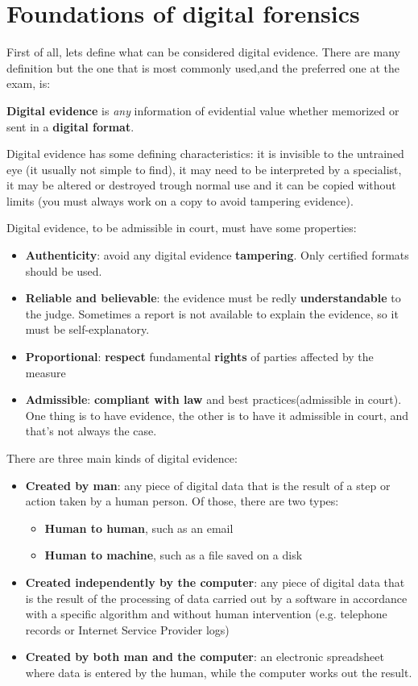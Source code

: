 \chapter{Foundations of digital forensics}
First of all, lets define what can be considered digital evidence.
There are many definition but the one that is most commonly used,and
the preferred one at the exam, is:
\begin{boxH}
  \textbf{Digital evidence} is \textit{any} information of evidential
  value whether memorized or sent in a \textbf{digital format}.
  \label{boxH:digital-evidence}
\end{boxH}
Digital evidence has some defining characteristics: it is invisible to
the untrained eye (it usually not simple to find), it may need to be
interpreted by a specialist, it may be altered or destroyed trough
normal use and it can be copied without limits (you must always work
on a copy to avoid tampering evidence).

Digital evidence, to be admissible in court, must have some
properties:
\begin{itemize}
  \item \textbf{Authenticity}: avoid any digital evidence
    \textbf{tampering}. Only certified formats should be used.
  \item \textbf{Reliable and believable}: the evidence must be redly
    \textbf{understandable} to the judge. Sometimes a report is not
    available to explain the evidence, so it must be self-explanatory.
  \item \textbf{Proportional}: \textbf{respect} fundamental
    \textbf{rights} of parties affected by the measure
  \item \textbf{Admissible}: \textbf{compliant with law} and best
    practices(admissible in court). One thing is to have evidence, the
    other is to have it admissible in court, and that's not always the
    case.
\end{itemize}

There are three main kinds of digital evidence:
\begin{itemize}
  \item \textbf{Created by man}: any piece of digital data that is the
    result of a step or action taken by a human person. Of those,
    there are two types:
    \begin{itemize}
      \item \textbf{Human to human}, such as an email
      \item \textbf{Human to machine}, such as a file saved on a disk
    \end{itemize}
  \item \textbf{Created independently by the computer}: any piece of
    digital data that is the result of the processing of data carried
    out by a software in accordance with a specific algorithm and
    without human intervention (e.g. telephone records or Internet
    Service Provider logs)
  \item \textbf{Created by both man and the computer}: an electronic
    spreadsheet where data is entered by the human, while the computer
    works out the result.
\end{itemize}

